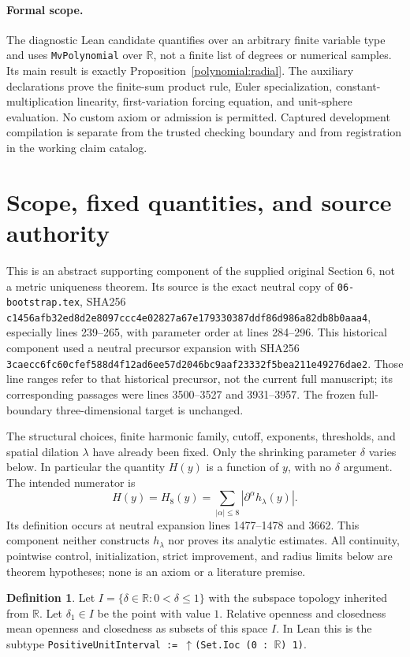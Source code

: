\documentclass[11pt]{article}
\theoremstyle{definition}
\newtheorem{definition}[theorem]{Definition}
\theoremstyle{remark}
\newcommand{\R}{\mathbb R}
\numberwithin{equation}{section}
\providecommand{\I}{I}
\begin{document}
\paragraph{Formal scope.}
The diagnostic Lean candidate quantifies over an arbitrary finite variable
type and uses \texttt{MvPolynomial} over $\R$, not a finite list of
degrees or numerical samples.  Its main result is exactly
Proposition~\ref{polynomial:radial}.  The auxiliary declarations prove the
finite-sum product rule, Euler specialization, constant-multiplication
linearity, first-variation forcing equation, and unit-sphere evaluation.
No custom axiom or admission is permitted.  Captured development
compilation is separate from the trusted checking boundary and from
registration in the working claim catalog.


\clearpage



\section{Scope, fixed quantities, and source authority}
This is an abstract supporting component of the supplied original Section 6,
not a metric uniqueness theorem.  Its source is the exact neutral copy of
\texttt{06-bootstrap.tex}, SHA256
\texttt{c1456afb32ed8d2e8097ccc4e02827a67e179330387ddf86d986a82db8b0aaa4},
especially lines 239--265, with parameter order at lines 284--296.
This historical component used a neutral precursor expansion with SHA256
\texttt{3caecc6fc60cfef588d4f12ad6ee57d2046bc9aaf23332f5bea211e49276dae2}.
Those line ranges refer to that historical precursor, not the current full manuscript; its corresponding passages were lines 3500--3527 and 3931--3957.
The frozen full-boundary three-dimensional target is unchanged.

The structural choices, finite harmonic family, cutoff, exponents,
thresholds, and spatial dilation $\lambda$ have already been fixed.
Only the shrinking parameter $\delta$ varies below.  In particular the
quantity $H(y)$ is a function of $y$, with no $\delta$ argument.
The intended numerator is
\[
 H(y)=H_8(y)=\sum_{|\alpha|\leq8}|\partial^\alpha h_\lambda(y)|.
\]
Its definition occurs at neutral expansion lines 1477--1478 and
3662.  This component neither constructs $h_\lambda$ nor proves its
analytic estimates.  All continuity, pointwise control, initialization,
strict improvement, and radius limits below are theorem hypotheses;
none is an axiom or a literature premise.

\begin{definition}\label{closure:interval}
Let $\I=\{\delta\in\R:0<\delta\leq1\}$ with the subspace topology
inherited from $\R$.  Let $\delta_1\in\I$ be the point with value $1$.
Relative openness and closedness mean openness and closedness as subsets
of this space $\I$.  In Lean this is the subtype
\texttt{PositiveUnitInterval := $\uparrow$(Set.Ioc (0 : $\R$) 1)}.
\end{definition}
\end{document}
